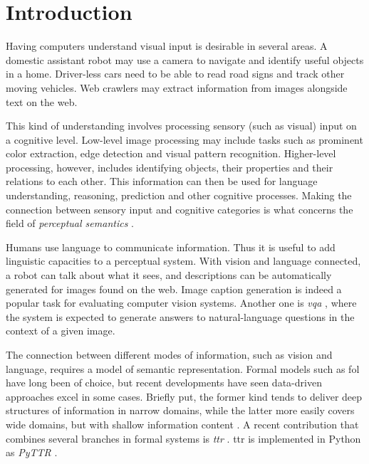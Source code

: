 \renewcommand{\sectionautorefname}{Section}
\let\subsectionautorefname\sectionautorefname
\let\subsubsectionautorefname\sectionautorefname
\glsresetall
\section{Introduction}
\label{sec:intro}

Having computers understand visual input is desirable in several areas.
A domestic assistant robot may use a camera to navigate and identify useful objects in a home.
Driver-less cars need to be able to read road signs and track other moving vehicles.
Web crawlers may extract information from images alongside text on the web.

This kind of understanding involves processing sensory (such as visual) input on a cognitive level.
Low-level image processing may include tasks such as prominent color extraction, edge detection and visual pattern recognition.
Higher-level processing, however, includes identifying objects, their properties and their relations to each other.
This information can then be used for language understanding, reasoning, prediction and other cognitive processes.
Making the connection between sensory input and cognitive categories is what concerns the field of \textit{perceptual semantics} \citep{PustejovskyPerceptualsemanticsconstruction1990}.

Humans use language to communicate information.
Thus it is useful to add linguistic capacities to a perceptual system.
With vision and language connected, a robot can talk about what it sees, and descriptions can be automatically generated for images found on the web.
Image caption generation is indeed a popular task for evaluating computer vision systems.
Another one is \textit{\gls{vqa}} \citep{AgrawalVQAVisualQuestion2015}, where the system is expected to generate answers to natural-language questions in the context of a given image.

The connection between different modes of information, such as vision and language, requires a model of semantic representation.
Formal models such as \gls{fol} have long been of choice, but recent developments have seen data-driven approaches excel in some cases.
Briefly put, the former kind tends to deliver deep structures of information in narrow domains, while the latter more easily covers wide domains, but with shallow information content \citep{Dobnik:2017ag}.
A recent contribution that combines several branches in formal systems is \textit{\gls{ttr}} \citep{CooperAustiniantruthattitudes2005,CooperTypetheorylanguage2016}.
\Gls{ttr} is implemented in Python as \textit{PyTTR} \citep{pyttr}.

